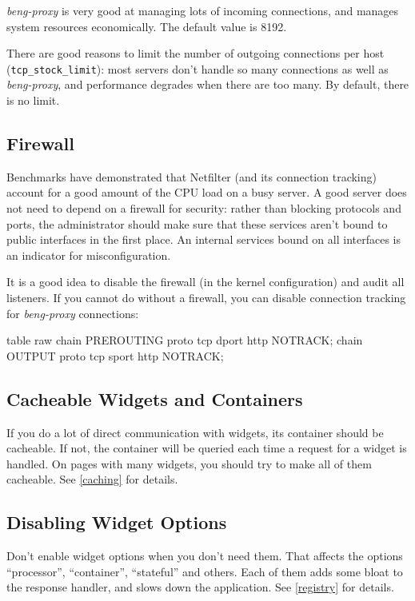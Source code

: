 \documentclass[a4paper,12pt]{article}
\begin{document}
\emph{beng-proxy} is very good at managing lots of incoming
connections, and manages system resources economically.  The default
value is 8192.

There are good reasons to limit the number of outgoing connections per
host (\verb|tcp_stock_limit|): most servers don't handle so many
connections as well as \emph{beng-proxy}, and performance degrades
when there are too many.  By default, there is no limit.

\subsection{Firewall}

Benchmarks have demonstrated that Netfilter (and its connection
tracking) account for a good amount of the CPU load on a busy server.
A good server does not need to depend on a firewall for security:
rather than blocking protocols and ports, the administrator should
make sure that these services aren't bound to public interfaces in the
first place.  An internal services bound on all interfaces is an
indicator for misconfiguration.

It is a good idea to disable the firewall (in the kernel
configuration) and audit all listeners.  If you cannot do without a
firewall, you can disable connection tracking for \emph{beng-proxy}
connections:

\begin{verbatim*}
table raw {
  chain PREROUTING proto tcp dport http NOTRACK;
  chain OUTPUT proto tcp sport http NOTRACK;
}
\end{verbatim*}

\subsection{Cacheable Widgets and Containers}

If you do a lot of direct communication with widgets, its container
should be cacheable.  If not, the container will be queried each time
a request for a widget is handled.  On pages with many widgets, you
should try to make all of them cacheable.  See \ref{caching} for
details.

\subsection{Disabling Widget Options}

Don't enable widget options when you don't need them.  That affects
the options ``processor'', ``container'', ``stateful'' and others.
Each of them adds some bloat to the response handler, and slows down
the application.  See \ref{registry} for details.
\end{document}
